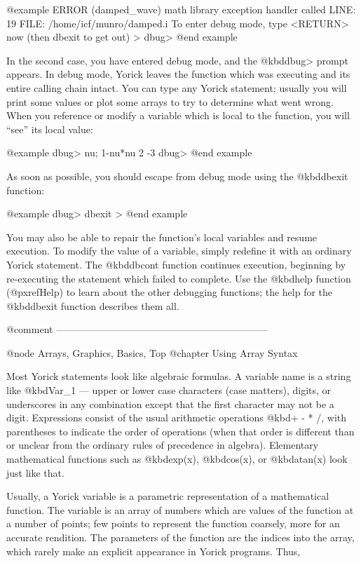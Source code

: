@example
ERROR (damped_wave) math library exception handler called
  LINE: 19  FILE: /home/icf/munro/damped.i
 To enter debug mode, type <RETURN> now (then dbexit to get out)
>
dbug>
@end example

In the second case, you have entered debug mode, and the @kbd{dbug>}
prompt appears.  In debug mode, Yorick leaves the function which was
executing and its entire calling chain intact.  You can type any Yorick
statement; usually you will print some values or plot some arrays to
try to determine what went wrong.  When you reference or modify a
variable which is local to the function, you will ``see'' its local
value:

@example
dbug> nu; 1-nu*nu
2
-3
dbug>
@end example

As soon as possible, you should escape from debug mode using the
@kbd{dbexit} function:

@example
dbug> dbexit
>
@end example

You may also be able to repair the function's local variables and
resume execution.  To modify the value of a variable, simply redefine
it with an ordinary Yorick statement.  The @kbd{dbcont} function
continues execution, beginning by re-executing the statement which
failed to complete.  Use the @kbd{help} function (@pxref{Help}) to learn
about the other debugging functions; the help for the @kbd{dbexit}
function describes them all.



@comment -----------------------------------------------------------------

@node    Arrays, Graphics, Basics, Top
@chapter Using Array Syntax

Most Yorick statements look like algebraic formulas.  A variable name is
a string like @kbd{Var_1} --- upper or lower case characters (case
matters), digits, or underscores in any combination except that the
first character may not be a digit.  Expressions consist of the usual
arithmetic operations @kbd{+ - * /}, with parentheses to indicate the
order of operations (when that order is different than or unclear from
the ordinary rules of precedence in algebra).  Elementary mathematical
functions such as @kbd{exp(x)}, @kbd{cos(x)}, or @kbd{atan(x)} look just
like that.

Usually, a Yorick variable is a parametric representation of a
mathematical function.  The variable is an array of numbers which are
values of the function at a number of points; few points to represent
the function coarsely, more for an accurate rendition.  The parameters
of the function are the indices into the array, which rarely make an
explicit appearance in Yorick programs.  Thus,

